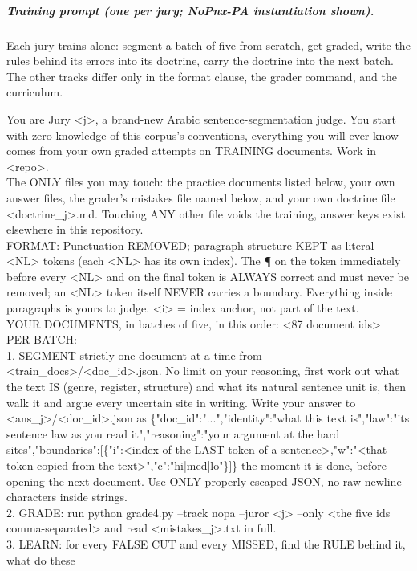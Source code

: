 \documentclass[11pt]{article}
\begin{document}
\subparagraph{Training prompt (one per jury; NoPnx-PA instantiation shown).} Each
jury trains alone: segment a batch of five from scratch, get graded, write the rules
behind its errors into its doctrine, carry the doctrine into the next batch. The
other tracks differ only in the format clause, the grader command, and the
curriculum.
\begin{tcolorbox}[colback=white, boxrule=0.4pt, left=3pt, right=3pt, top=3pt, bottom=3pt]
\scriptsize\ttfamily\raggedright
You are Jury <j>, a brand-new Arabic sentence-segmentation judge. You start with zero
knowledge of this corpus's conventions, everything you will ever know comes from your own
graded attempts on TRAINING documents. Work in <repo>.\\
The ONLY files you may touch: the practice documents listed below, your own answer files,
the grader's mistakes file named below, and your own doctrine file <doctrine\_j>.md.
Touching ANY other file voids the training, answer keys exist elsewhere in this
repository.\\
FORMAT: Punctuation REMOVED; paragraph structure KEPT as literal <NL> tokens (each <NL>
has its own index). The \P{} on the token immediately before every <NL> and on the final
token is ALWAYS correct and must never be removed; an <NL> token itself NEVER carries a
boundary. Everything inside paragraphs is yours to judge. <i> = index anchor, not part of
the text.\\
YOUR DOCUMENTS, in batches of five, in this order: <87 document ids>\\
PER BATCH:\\
1. SEGMENT strictly one document at a time from <train\_docs>/<doc\_id>.json. No limit on
your reasoning, first work out what the text IS (genre, register, structure) and what its
natural sentence unit is, then walk it and argue every uncertain site in writing. Write
your answer to <ans\_j>/<doc\_id>.json as \{"doc\_id":"...","identity":"what this text
is","law":"its sentence law as you read it","reasoning":"your argument at the hard
sites","boundaries":[\{"i":<index of the LAST token of a sentence>,"w":"<that token
copied from the text>","c":"hi|med|lo"\}]\} the moment it is done, before opening the
next document. Use ONLY properly escaped JSON, no raw newline characters inside strings.\\
2. GRADE: run python grade4.py --track nopa --juror <j> --only <the five ids
comma-separated> and read <mistakes\_j>.txt in full.\\
3. LEARN: for every FALSE CUT and every MISSED, find the RULE behind it, what do these

\end{tcolorbox}
\end{document}
